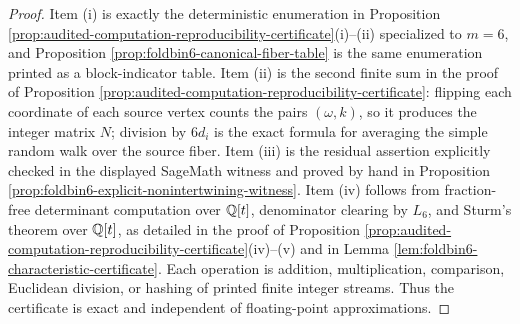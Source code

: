 \begin{proof}
Item \textup{(i)} is exactly the deterministic enumeration in Proposition \ref{prop:audited-computation-reproducibility-certificate}\textup{(i)}--\textup{(ii)} specialized to \(m=6\), and Proposition \ref{prop:foldbin6-canonical-fiber-table} is the same enumeration printed as a block-indicator table.  Item \textup{(ii)} is the second finite sum in the proof of Proposition \ref{prop:audited-computation-reproducibility-certificate}: flipping each coordinate of each source vertex counts the pairs \((\omega,k)\), so it produces the integer matrix \(N\); division by \(6d_i\) is the exact formula for averaging the simple random walk over the source fiber.  Item \textup{(iii)} is the residual assertion explicitly checked in the displayed SageMath witness and proved by hand in Proposition \ref{prop:foldbin6-explicit-nonintertwining-witness}.  Item \textup{(iv)} follows from fraction-free determinant computation over \(\mathbb{Q}[t]\), denominator clearing by \(L_6\), and Sturm's theorem over \(\mathbb{Q}[t]\), as detailed in the proof of Proposition \ref{prop:audited-computation-reproducibility-certificate}\textup{(iv)}--\textup{(v)} and in Lemma \ref{lem:foldbin6-characteristic-certificate}.  Each operation is addition, multiplication, comparison, Euclidean division, or hashing of printed finite integer streams.  Thus the certificate is exact and independent of floating-point approximations. \qedhere
\end{proof}



